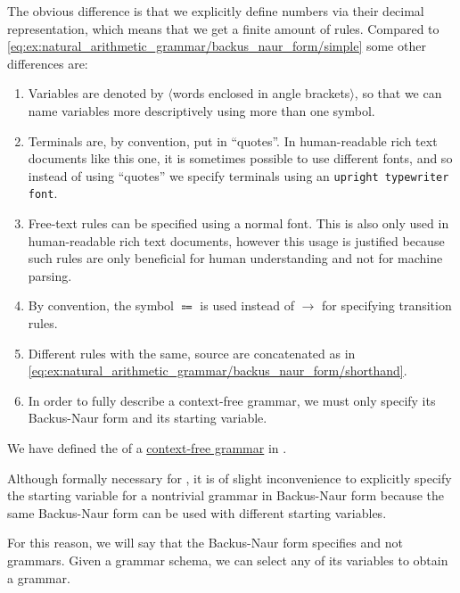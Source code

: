 \begin{example}
  The obvious difference is that we explicitly define numbers via their decimal representation, which means that we get a finite amount of rules. Compared to \eqref{eq:ex:natural_arithmetic_grammar/backus_naur_form/simple} some other differences are:
  \begin{enumerate}
    \item Variables are denoted by \( \langle \)words enclosed in angle brackets\( \rangle \), so that we can name variables more descriptively using more than one symbol.
    \item Terminals are, by convention, put in \enquote{quotes}. In human-readable rich text documents like this one, it is sometimes possible to use different fonts, and so instead of using \enquote{quotes} we specify terminals using an \texttt{upright typewriter font}.
    \item Free-text rules can be specified using a normal font. This is also only used in human-readable rich text documents, however this usage is justified because such rules are only beneficial for human understanding and not for machine parsing.
    \item By convention, the symbol \( \Coloneqq \) is used instead of \( \to \) for specifying transition rules.
    \item Different rules with the same, source are concatenated as in \eqref{eq:ex:natural_arithmetic_grammar/backus_naur_form/shorthand}.
    \item In order to fully describe a context-free grammar, we must only specify its Backus-Naur form and its starting variable.
  \end{enumerate}
\end{example}

\begin{definition}\label{def:backus_naur_form}
  We have defined the  of a \hyperref[def:grammar/context_free]{context-free grammar} in .

  Although formally necessary for , it is of slight inconvenience to explicitly specify the starting variable for a nontrivial grammar in Backus-Naur form because the same Backus-Naur form can be used with different starting variables.

  For this reason, we will say that the Backus-Naur form specifies  and not grammars. Given a grammar schema, we can select any of its variables to obtain a grammar.
\end{definition}

